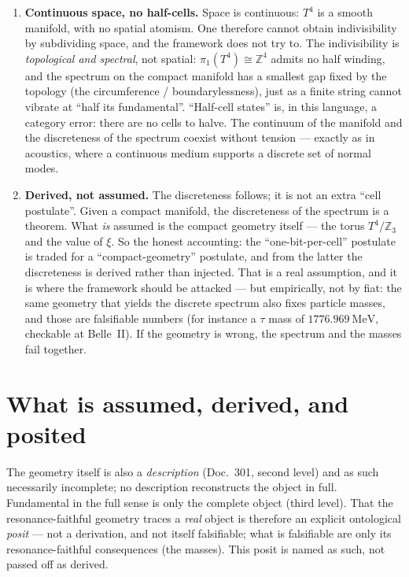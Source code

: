 \begin{enumerate}
\item \textbf{Continuous space, no half-cells.} Space is continuous: $T^4$ is a smooth
manifold, with no spatial atomism. One therefore cannot obtain indivisibility by
subdividing space, and the framework does not try to. The indivisibility is
\emph{topological and spectral}, not spatial: $\pi_1(T^4)\cong\mathbb{Z}^4$ admits no
half winding, and the spectrum on the compact manifold has a smallest gap fixed by the
topology (the circumference / boundarylessness), just as a finite string
cannot vibrate at \enquote{half its fundamental}. \enquote{Half-cell states} is, in
this language, a category error: there are no cells to halve. The continuum of the
manifold and the discreteness of the spectrum coexist without tension --- exactly as in
acoustics, where a continuous medium supports a discrete set of normal modes.

\item \textbf{Derived, not assumed.} The discreteness follows; it is not an extra
\enquote{cell postulate}. Given a compact manifold, the discreteness of the spectrum
is a theorem. What \emph{is} assumed is the compact geometry itself --- the torus
$T^4/\mathbb{Z}_3$ and the value of $\xi$. So the honest accounting: the
\enquote{one-bit-per-cell} postulate is traded for a \enquote{compact-geometry}
postulate, and from the latter the discreteness is derived rather than injected. That
is a real assumption, and it is where the framework should be attacked --- but
empirically, not by fiat: the same geometry that yields the discrete spectrum also
fixes particle masses, and those are falsifiable numbers (for instance a $\tau$ mass
of $1776.969~\mathrm{MeV}$, checkable at Belle~II). If the geometry is wrong, the
spectrum and the masses fail together.
\end{enumerate}

\section{What is assumed, derived, and posited}

The geometry itself is also a \emph{description} (Doc.~301, second level) and as such
necessarily incomplete; no description reconstructs the object in full. Fundamental in
the full sense is only the complete object (third level). That the resonance-faithful
geometry traces a \emph{real} object is therefore an explicit ontological \emph{posit}
--- not a derivation, and not itself falsifiable; what is falsifiable are only its
resonance-faithful consequences (the masses). This posit is named as such, not passed off as derived.

